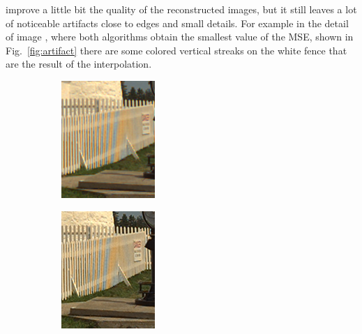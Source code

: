 \documentclass[a4paper,oneside]{article}
\begin{document}
improve a little bit the quality of the reconstructed images, but it
still leaves a lot of noticeable artifacts close to edges and small
details. For example in the detail of image ,
where both algorithms obtain the smallest value of the MSE, shown in
Fig.~\ref{fig:artifact} there are some colored vertical streaks on the
white fence that are the result of the interpolation.
\begin{figure}[htbp]
  \centering
  \begin{subfigure}{.5\textwidth}
  \centering
  \includegraphics[width=.8\linewidth]{demosaic_kodim19_artifact}
  \caption{}
\end{subfigure}%
\begin{subfigure}{.5\textwidth}
  \centering
  \includegraphics[width=.8\linewidth]{matlab_demosaic_kodim19_artifact}

\end{subfigure}
\end{figure}
\end{document}
